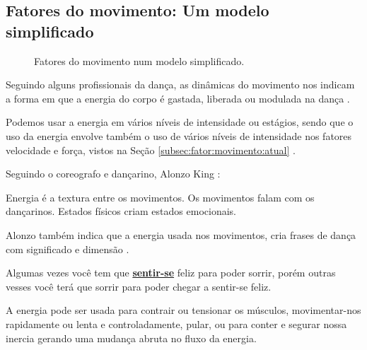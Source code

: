 \subsection{Fatores do movimento: Um modelo simplificado}

\begin{figure}
\centering
{} 
\caption{Fatores do movimento num modelo simplificado.}
\label{fig:fatores:moviemnto:simplificada}
\end{figure}
Seguindo alguns profissionais  da dança, 
as dinâmicas do movimento nos indicam a forma em que a energia do corpo
é gastada, liberada ou modulada na dança \cite[pp. 126, 131, 136]{mccutchen2006teaching}.

Podemos usar a energia em vários níveis de intensidade ou estágios,
sendo que o uso da energia envolve também o uso de vários níveis de intensidade 
nos fatores velocidade e força, vistos na Seção  \ref{subsec:fator:movimento:atual} \cite[pp. 99]{sofras2019dance}.

Seguindo o coreografo e dançarino, Alonzo King \cite[pp. 99, 100]{sofras2019dance}:
\begin{citando}%
Energia é a textura entre os movimentos.
Os movimentos falam com os dançarinos.
Estados físicos criam estados emocionais.
\end{citando}
Alonzo também indica que a energia usada nos movimentos,
 cria frases de dança com significado e dimensão \cite[pp. 99]{sofras2019dance}.

\begin{FraseFernandoPR}
Algumas vezes você tem que \hyperref[ref:emotionsentimental]{\textbf{sentir-se}} feliz para poder sorrir,
porém outras vesses você terá que sorrir para poder chegar a sentir-se feliz. %
\end{FraseFernandoPR}

A energia pode ser usada para contrair ou tensionar os músculos,
movimentar-nos rapidamente ou lenta e controladamente, pular, 
ou para conter e segurar nossa inercia gerando uma mudança abruta no fluxo da energia.

